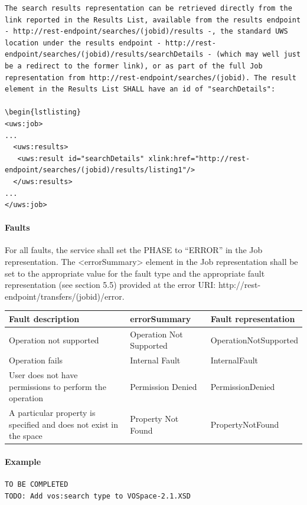 \documentclass[11pt,a4paper]{ivoa}
\begin{document}
\begin{lstlisting}
The search results representation can be retrieved directly from the link reported in the Results List, available from the results endpoint - http://rest-endpoint/searches/(jobid)/results -, the standard UWS location under the results endpoint - http://rest-endpoint/searches/(jobid)/results/searchDetails - (which may well just be a redirect to the former link), or as part of the full Job representation from http://rest-endpoint/searches/(jobid). The result element in the Results List SHALL have an id of "searchDetails":

\begin{lstlisting}
<uws:job>
...
  <uws:results>
   <uws:result id="searchDetails" xlink:href="http://rest-endpoint/searches/(jobid)/results/listing1"/>
  </uws:results>
...
</uws:job>
\end{lstlisting}

\paragraph{Faults}
For all faults, the service shall set the PHASE to ``ERROR'' in the Job representation. The <errorSummary> element in the Job representation shall be set to the appropriate value for the fault type and the appropriate fault representation (see section 5.5) provided at the error URI: http://rest-endpoint/transfers/(jobid)/error.

\vspace{3mm}
\begin{tabular}{ p{5cm} l p{4cm} }
\textbf{Fault description} & \textbf{errorSummary} & \textbf{Fault representation} \\
\hline
Operation not supported & Operation Not Supported & OperationNotSupported \\
\hline
Operation fails & Internal Fault & InternalFault \\
\hline
User does not have permissions to perform the operation	 & Permission Denied & PermissionDenied \\
\hline
A particular property is specified and does not exist in the space & Property Not Found & PropertyNotFound \\
\hline
\end{tabular}
\vspace{3mm}

\paragraph{Example}

\begin{lstlisting}
TO BE COMPLETED
TODO: Add vos:search type to VOSpace-2.1.XSD
\end{lstlisting}
\end{document}
